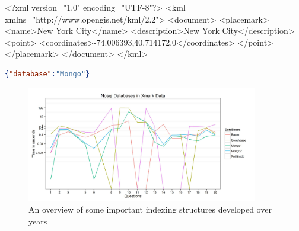 
\begin{fakeXML}[label=kml,caption=A simple KML example representing a Point]

<?xml version="1.0" encoding="UTF-8"?>
<kml xmlns="http://www.opengis.net/kml/2.2">
<document>
<placemark>
  <name>New York City</name>
  <description>New York City</description>
  <point>
    <coordinates>-74.006393,40.714172,0</coordinates>
  </point>
</placemark>
</document>
</kml>
\end{fakeXML} 

\begin{fakeJSON}[label=kml,caption=JSON Data]
\end{fakeJSON} 

\begin{lstlisting}[language=json,firstnumber=1]
{"database":"Mongo"}
\end{lstlisting}
\begin{figure}
	\centering
	\includegraphics[width=0.9\textwidth]{img/Plot7}
	\caption{An overview of some important indexing structures developed over years}
	\label{trees}
\end{figure}

